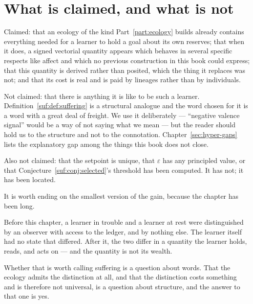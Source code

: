 \section{What is claimed, and what is not}
\label{suf:S6}

Claimed: that an ecology of the kind Part~\ref{part:ecology} builds
already contains everything needed for a learner to hold a goal about its
own reserves; that when it does, a signed vectorial quantity appears
which behaves in several specific respects like affect and which no
previous construction in this book could express; that this quantity is
derived rather than posited, which the thing it replaces was not; and
that its cost is real and is paid by lineages rather than by individuals.

Not claimed: that there is anything it is like to be such a learner.
Definition~\ref{suf:def:suffering} is a structural analogue and the word
chosen for it is a word with a great deal of freight.
We use it deliberately --- ``negative valence signal'' would be a way of
not saying what we mean --- but the reader should hold us to the
structure and not to the connotation.
Chapter~\ref{sec:hyper-gaps} lists the explanatory gap among the things
this book does not close.

Also not claimed: that the setpoint is unique, that $\varepsilon$ has any
principled value, or that
Conjecture~\ref{suf:conj:selected}'s threshold has been computed.
It has not; it has been located.

\begin{remark}
\label{suf:rem:payoff}
It is worth ending on the smallest version of the gain, because the
chapter has been long.

Before this chapter, a learner in trouble and a learner at rest were
distinguished by an observer with access to the ledger, and by nothing
else.
The learner itself had no state that differed.
After it, the two differ in a quantity the learner holds, reads, and acts
on --- and the quantity is not its wealth.

Whether that is worth calling suffering is a question about words.
That the ecology admits the distinction at all, and that the distinction
costs something and is therefore not universal, is a question about
structure, and the answer to that one is yes.
\end{remark}

